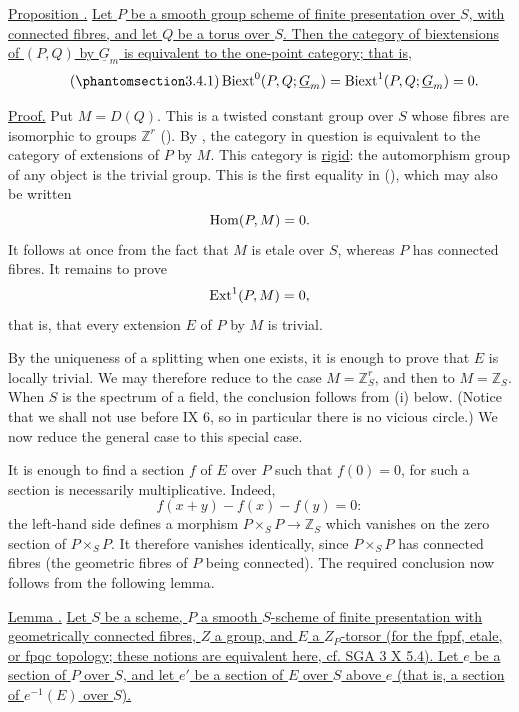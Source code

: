 
\medskip
\noindent\underline{Proposition .}  \underline{Let $P$ be a smooth
group scheme of finite presentation over $S$, with connected fibres,
and let $Q$ be a torus over $S$.  Then the category of biextensions
of $(P,Q)$ by $\underline G_m$ is equivalent to the one-point
category; that is,}
\begin{equation}\tag{\SGARefTarget{sga7.sga7i.eviii.n3-4-1}{3.4.1}}
 \Biext^0(P,Q;\underline G_m)=
 \Biext^1(P,Q;\underline G_m)=0.
\end{equation}

\noindent\underline{Proof.}  Put $M=D(Q)$.  This is a twisted
constant group over $S$ whose fibres are isomorphic to groups
$\mathbb Z^r$ ().  By , the category in question is
equivalent to the category of extensions of $P$ by $M$.  This
category is \underline{rigid}: the automorphism group of any object
is the trivial group.  This is the first equality in (), which
may also be written
\[
 \operatorname{Hom}(P,M)=0.
\]
It follows at once from the fact that $M$ is etale over $S$, whereas
$P$ has connected fibres.  It remains to prove
\[
 \operatorname{Ext}^1(P,M)=0,
\]
that is, that every extension $E$ of $P$ by $M$ is trivial.

By the uniqueness of a splitting when one exists, it is enough to
prove that $E$ is locally trivial.  We may therefore reduce to the
case $M=\mathbb Z_S^r$, and then to $M=\mathbb Z_S$.  When $S$ is the
spectrum of a field, the conclusion follows from  (i) below.
(Notice that we shall not use  before IX 6, so in particular there
is no vicious circle.)  We now reduce the general case to this
special case.

It is enough to find a section $f$ of $E$ over $P$ such that
$f(0)=0$, for such a section is necessarily multiplicative.  Indeed,
\[
 f(x+y)-f(x)-f(y)=0:
\]
the left-hand side defines a morphism
$P\times_S P\longrightarrow\mathbb Z_S$ which vanishes on the zero
section of $P\times_S P$.  It therefore vanishes identically, since
$P\times_S P$ has connected fibres (the geometric fibres of $P$
being connected).  The required conclusion now follows from the
following lemma.

\medskip
\noindent\underline{Lemma .}  \underline{Let $S$ be a scheme,
$P$ a smooth $S$-scheme of finite presentation with geometrically
connected fibres, $Z$ a group, and $E$ a $Z_P$-torsor (for the fppf,
etale, or fpqc topology; these notions are equivalent here, cf. SGA
3 X 5.4).  Let $e$ be a section of $P$ over $S$, and let $e'$ be a
section of $E$ over $S$ above $e$ (that is, a section of $e^{-1}(E)$
over $S$).}

